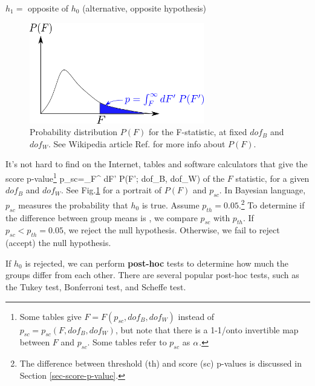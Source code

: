 $h_1=$ opposite of $h_0$  (alternative, opposite hypothesis)

\begin{figure}[h!]
\centering
\includegraphics[width=3in]
{ANOVA/f-dist.png}
\caption{Probability distribution $P(F)$
for the F-statistic, 
at fixed $dof_B$ and $dof_W$. See Wikipedia article
Ref.\cite{wiki-f-dist}
for more info about $P(F)$.}
\label{fig-f-dist}
\end{figure}

It's not
hard to find on the Internet, tables 
and 
software calculators 
that give 
the score p-value\footnote{Some tables give
$F=F(p_{sc}, dof_B, dof_W)$
instead of $p_{sc}=p_{sc}(F, dof_B, dof_W)$,
but note that there is a 1-1/onto 
invertible map between $F$ and $p_{sc}$.
Some tables refer  to $p_{sc}$
as $\alpha$.
} 
\beq
p_{sc}=\int_{F}^{\infty}
dF'\; P(F'; dof_B, dof_W)
\eeq
of the $F$ statistic,
for a given $dof_B$ and $dof_W$.
See Fig.\ref{fig-f-dist} 
for a portrait of $P(F)$ and $p_{sc}$.
In Bayesian language,
$p_{sc}$
measures
the probability
that $h_0$ is true.
Assume $p_{th}=0.05$.\footnote{
The difference between 
threshold (th)
and score (sc) p-values
is discussed in Section \ref{sec-score-p-value}.}
To determine if the difference between group means is ,
we compare $p_{sc}$ with $p_{th}$. 
If $p_{sc}<p_{th}=0.05$, we reject the null hypothesis.
Otherwise, we fail to reject (accept) the null hypothesis.

If $h_0$ is rejected,  we can  perform {\bf post-hoc} tests to determine how much 
the groups differ from each other.
There are several  popular post-hoc tests,
such as 
the
Tukey test,
Bonferroni test, and 
Scheffe test.

